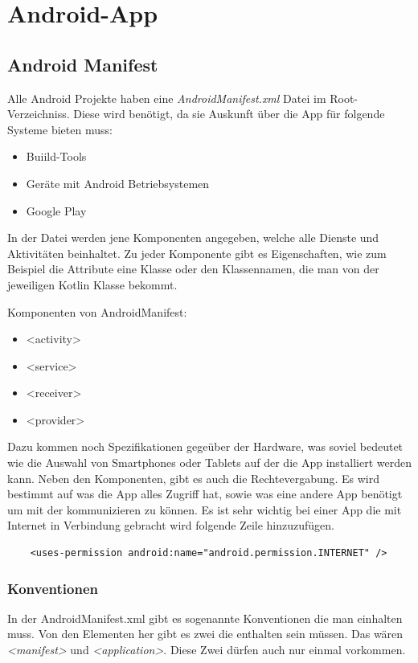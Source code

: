 \section{Android-App}
\author{Bozidar Spasenovic}
\subsection{Android Manifest}
Alle Android Projekte haben eine \textit{AndroidManifest.xml} Datei im Root-Verzeichniss. Diese wird benötigt, da sie  
Auskunft über die App für folgende Systeme bieten muss:

\begin{itemize}
    \item Buiild-Tools
    \item Geräte mit Android Betriebsystemen
    \item Google Play 
\end{itemize}  

In der Datei werden jene Komponenten angegeben, welche alle Dienste und Aktivitäten beinhaltet.
Zu jeder Komponente gibt es Eigenschaften, wie zum Beispiel die Attribute eine Klasse oder den Klassennamen,
 die man von der jeweiligen Kotlin Klasse bekommt.

 Komponenten von AndroidManifest:

 \begin{itemize}
     \item <activity>
     \item <service>
     \item <receiver>
     \item <provider>    
 \end{itemize}



Dazu kommen noch Spezifikationen gegeüber der Hardware, was soviel bedeutet wie die Auswahl von Smartphones oder Tablets
auf der die App installiert werden kann.
 Neben den Komponenten, gibt es auch die Rechtevergabung. Es wird bestimmt auf was die App alles Zugriff hat, sowie
 was eine andere App benötigt um mit der kommunizieren zu können.
 Es ist sehr wichtig bei einer App die mit Internet in Verbindung gebracht wird folgende Zeile hinzuzufügen.
 
 \begin{lstlisting}
    <uses-permission android:name="android.permission.INTERNET" />
\end{lstlisting}

\subsubsection{Konventionen}
In der AndroidManifest.xml gibt es sogenannte Konventionen die man einhalten muss.
Von den Elementen her gibt es zwei die enthalten sein müssen. Das wären \textit{<manifest>} und \textit{<application>}.
Diese Zwei dürfen auch nur einmal vorkommen.

